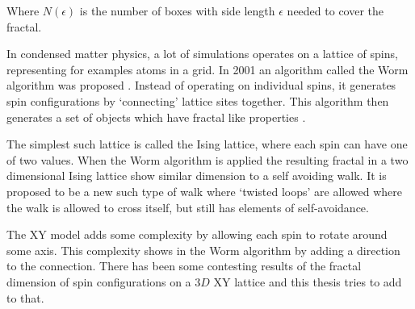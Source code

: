 Where $N(\epsilon)$ is the number of boxes with side length $\epsilon$ needed to cover the fractal.

In condensed matter physics, a lot of simulations operates on a lattice of spins, representing for examples atoms in a grid. In 2001 an algorithm called the Worm algorithm was proposed \cite{Prokofev:first_worm_algorithm}. Instead of operating on individual spins, it generates spin configurations by `connecting' lattice sites together. This algorithm then generates a set of objects which have fractal like properties \cite{Duplantier:GeoHausdorff}.

The simplest such lattice is called the Ising lattice, where each spin can have one of two values. When the Worm algorithm is applied the resulting fractal in a two dimensional Ising lattice show similar dimension to a self avoiding walk. It is proposed to be a new such type of walk where `twisted loops' are allowed where the walk is allowed to cross itself, but still has elements of self-avoidance.

The XY model adds some complexity by allowing each spin to rotate around some axis. This complexity shows in the Worm algorithm by adding a direction to the connection. There has been some contesting results of the fractal dimension of spin configurations on a $3D$ XY lattice \cite{Prokofev:comment_on_hove_hausdorff_crit_fluct}\cite{Hove:hausdorff_crit_fluctuations} and this thesis tries to add to that. 













